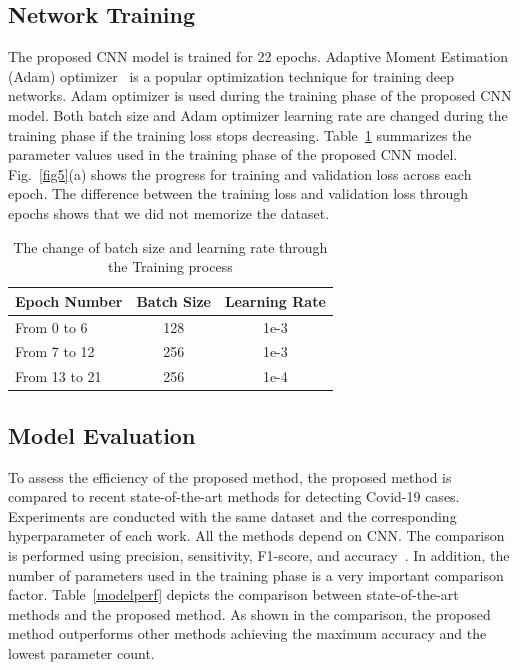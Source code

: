 \subsection{Network Training}
The proposed CNN model is trained for 22 epochs. Adaptive Moment Estimation (Adam) optimizer~\cite{kingma2014adam} is a popular optimization technique for training deep networks. Adam optimizer is used during the training phase of the proposed CNN model. Both batch size and Adam optimizer learning rate are changed during the training phase if the training loss stops decreasing. Table~\ref{tabTrparam} summarizes the parameter values used in the training phase of the proposed CNN model. Fig.~\ref{fig5}(a) shows the progress for training and validation loss across each epoch. The difference between the training loss and validation loss through epochs shows that we did not memorize the dataset.
\begin{table}[htbp]
\caption{The change of batch size and learning rate through the Training process}
\begin{center}

\begin{tabular}{|l|c|c|}
\hline
\textbf{Epoch Number} & \textbf{Batch Size} & \textbf{Learning Rate} \\
\hline
\hline
From 0 to 6 & 128 & 1e-3\\
\hline
From 7 to 12 & 256 & 1e-3\\
\hline
From 13 to 21 & 256 & 1e-4\\
\hline
 
\end{tabular}
\label{tabTrparam}
\end{center}
\end{table}



\subsection{Model Evaluation}

To assess the efficiency of the proposed method,  the proposed method is compared to recent state-of-the-art methods for detecting Covid-19 cases. Experiments are conducted with the same dataset and the corresponding hyperparameter of each work. All the methods depend on CNN. The comparison is performed using precision, sensitivity, F1-score, and accuracy~\cite{hossin2015review}. In addition, the number of parameters used in the training phase is a very important comparison factor. Table~\ref{modelperf} depicts the comparison between state-of-the-art methods and the proposed method. As shown in the comparison, the proposed method outperforms other methods achieving the maximum accuracy and the lowest parameter count. 



